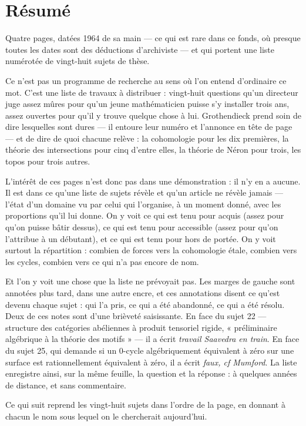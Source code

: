\documentclass[11pt,a4paper]{article}
\begin{document}
\section*{Résumé}

\begin{resume}
Quatre pages, datées 1964 de sa main --- ce qui est rare dans ce fonds, où
presque toutes les dates sont des déductions d'archiviste --- et qui portent une
liste numérotée de vingt-huit sujets de thèse.

Ce n'est pas un programme de recherche au sens où l'on entend d'ordinaire ce
mot. C'est une liste de travaux à distribuer : vingt-huit questions qu'un
directeur juge assez mûres pour qu'un jeune mathématicien puisse s'y installer
trois ans, assez ouvertes pour qu'il y trouve quelque chose à lui. Grothendieck
prend soin de dire lesquelles sont dures --- il entoure leur numéro et
l'annonce en tête de page --- et de dire de quoi chacune relève : la cohomologie
pour les dix premières, la théorie des intersections pour cinq d'entre elles,
la théorie de Néron pour trois, les topos pour trois autres.

L'intérêt de ces pages n'est donc pas dans une démonstration : il n'y en a
aucune. Il est dans ce qu'une liste de sujets révèle et qu'un article ne
révèle jamais --- l'état d'un domaine vu par celui qui l'organise, à un moment
donné, avec les proportions qu'il lui donne. On y voit ce qui est tenu pour
acquis (assez pour qu'on puisse bâtir dessus), ce qui est tenu pour accessible
(assez pour qu'on l'attribue à un débutant), et ce qui est tenu pour hors de
portée. On y voit surtout la répartition : combien de forces vers la
cohomologie étale, combien vers les cycles, combien vers ce qui n'a pas encore
de nom.

Et l'on y voit une chose que la liste ne prévoyait pas. Les marges de gauche
sont annotées plus tard, dans une autre encre, et ces annotations disent ce
qu'est devenu chaque sujet : qui l'a pris, ce qui a été abandonné, ce qui a été
résolu. Deux de ces notes sont d'une brièveté saisissante. En face du sujet 22
--- structure des catégories abéliennes à produit tensoriel rigide, « préliminaire
algébrique à la théorie des motifs » --- il a écrit \emph{travail Saavedra en
train}. En face du sujet 25, qui demande si un 0-cycle algébriquement
équivalent à zéro sur une surface est rationnellement équivalent à zéro, il a
écrit \emph{faux, cf Mumford}. La liste enregistre ainsi, sur la même feuille,
la question et la réponse : à quelques années de distance, et sans commentaire.

Ce qui suit reprend les vingt-huit sujets dans l'ordre de la page, en donnant à
chacun le nom sous lequel on le chercherait aujourd'hui.

\end{resume}
\end{document}
